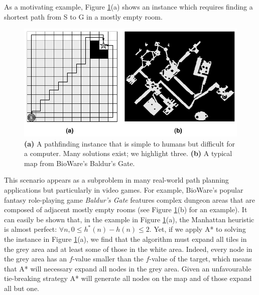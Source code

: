 As a motivating example, Figure \ref{fig-emptymap}(a) shows an instance
which requires finding a shortest path from S to G in a mostly empty room.
\begin{figure}[htbp]
	\vspace{-4pt}
       \begin{center}
         \includegraphics[scale=0.30, trim = 20mm 20mm 20mm 0mm]{diagrams/emptymap.png}
       \end{center}
	\vspace{-3pt}
       \caption{\textbf{(a)} A pathfinding instance that is simple to humans but difficult for a computer. Many solutions exist; we highlight three. 
\textbf{(b)} A typical map from BioWare's Baldur's Gate.}
       \label{fig-emptymap}
	\vspace{-12pt}
\end{figure}
This scenario appears as a subproblem in many real-world path planning applications but particularly
in video games.
For example, BioWare's popular fantasy role-playing game \emph{Baldur's Gate} features complex dungeon
 areas that are composed of adjacent mostly empty rooms (see Figure \ref{fig-emptymap}(b) for an example).
It can easily be shown that, in the example in Figure \ref{fig-emptymap}(a), the Manhattan heuristic is almost perfect: $\forall n, 0 \leq h^*(n) - h(n) \leq 2$.
Yet, if we apply A* \cite{hart68} to solving the instance in Figure \ref{fig-emptymap}(a), 
we find that the algorithm must expand all tiles in the grey 
area and at least some of those in the white area.
Indeed, every node in the grey area has an $f$-value smaller than the $f$-value of the target,
which means that A* will necessary expand all nodes in the grey area.
Given an unfavourable tie-breaking strategy A* will generate all nodes on the map and of those expand 
all but one.

